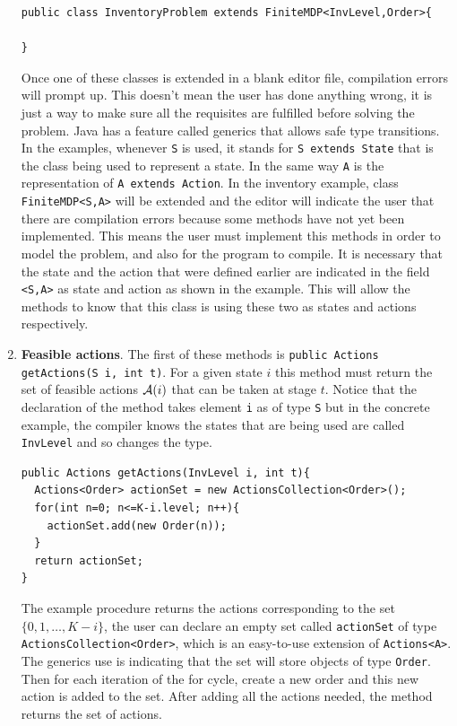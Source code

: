 \documentclass[11pt]{article}
\newcommand {\cA}{\ensuremath \mathcal{A}}
\begin{document}
\begin{enumerate}
\lstset{title=,caption=}
\begin{lstlisting}
public class InventoryProblem extends FiniteMDP<InvLevel,Order>{

}
\end{lstlisting}

Once one of these classes is extended in a blank editor file, compilation errors will prompt up. This doesn't mean the user has done anything wrong, it is just a way to make sure all the requisites are fulfilled before solving the problem. Java has a feature called generics that allows safe type transitions. In the examples, whenever \lstinline!S! is used, it stands for \lstinline!S extends State! that is the class being used to represent a state. In the same way \lstinline!A! is the representation of \lstinline!A extends Action!. In the inventory example, class \lstinline!FiniteMDP<S,A>! will be extended and the editor will indicate the user that there are compilation errors because some methods have not yet been implemented. This means the user must implement this methods in order to model the problem, and also for the program to compile. It is necessary that the state and the action that were defined earlier are indicated in the field \lstinline!<S,A>! as state and action as shown in the example. This will allow the methods to know that this class is using these two as states and actions respectively.

\item \textbf{Feasible actions}. The first of these methods is \lstinline!public Actions getActions(S i, int t)!. For a given state $i$ this method must return the set of feasible actions $\cA(i)$ that can be taken at stage $t$. Notice that the declaration of the method takes element \lstinline!i! as of type \lstinline!S! but in the concrete example, the compiler knows the states that are being used are called \lstinline!InvLevel! and so changes the type.

\begin{lstlisting}
public Actions getActions(InvLevel i, int t){
  Actions<Order> actionSet = new ActionsCollection<Order>();
  for(int n=0; n<=K-i.level; n++){
    actionSet.add(new Order(n));
  }
  return actionSet;
}
\end{lstlisting}

The example procedure returns the actions corresponding to the set $\{0,1,\ldots,K-i\}$, the user can declare an empty set called \lstinline!actionSet! of type \lstinline!ActionsCollection<Order>!, which is an easy-to-use extension of \lstinline!Actions<A>!. The generics use is indicating that the set will store objects of type \lstinline!Order!. Then for each iteration of the for cycle, create a new order and this new action is added to the set. After adding all the actions needed, the method returns the set of actions.


\end{enumerate}
\end{document}
